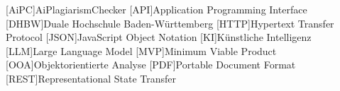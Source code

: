 \addchap*{\langacronyms}
\begin{acronym}
    [AiPC]{AiPlagiarismChecker}
    [API]{Application Programming Interface}
    [DHBW]{Duale Hochschule Ba\-den-\-Würt\-tem\-berg}
    [HTTP]{Hypertext Transfer Protocol}
    [JSON]{JavaScript Object Notation}
    [KI]{Künstliche Intelligenz}
    [LLM]{Large Language Model}
    [MVP]{Minimum Viable Product}
    [OOA]{Objektorientierte Analyse}
    [PDF]{Portable Document Format}
    [REST]{Representational State Transfer}
\end{acronym}